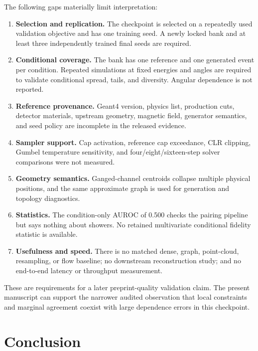 \documentclass[11pt]{article}
\begin{document}
The following gaps materially limit interpretation:
\begin{enumerate}
 \item \textbf{Selection and replication.} The checkpoint is selected on a repeatedly used validation objective and has one training seed. A newly locked bank and at least three independently trained final seeds are required.
 \item \textbf{Conditional coverage.} The bank has one reference and one generated event per condition. Repeated simulations at fixed energies and angles are required to validate conditional spread, tails, and diversity. Angular dependence is not reported.
 \item \textbf{Reference provenance.} Geant4 version, physics list, production cuts, detector materials, upstream geometry, magnetic field, generator semantics, and seed policy are incomplete in the released evidence.
 \item \textbf{Sampler support.} Cap activation, reference cap exceedance, CLR clipping, Gumbel temperature sensitivity, and four/eight/sixteen-step solver comparisons were not measured.
 \item \textbf{Geometry semantics.} Ganged-channel centroids collapse multiple physical positions, and the same approximate graph is used for generation and topology diagnostics.
 \item \textbf{Statistics.} The condition-only AUROC of 0.500 checks the pairing pipeline but says nothing about showers. No retained multivariate conditional fidelity statistic is available.
 \item \textbf{Usefulness and speed.} There is no matched dense, graph, point-cloud, resampling, or flow baseline; no downstream reconstruction study; and no end-to-end latency or throughput measurement.
\end{enumerate}

These are requirements for a later preprint-quality validation claim. The present manuscript can support the narrower audited observation that local constraints and marginal agreement coexist with large dependence errors in this checkpoint.

\section{Conclusion}
\end{document}
